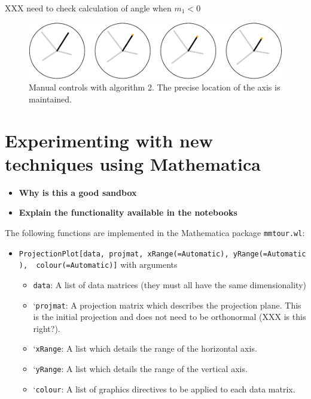 \documentclass[]{interact}
\theoremstyle{plain}%
\theoremstyle{definition}
\theoremstyle{remark}
\providecommand{\tightlist}{%
  \setlength{\itemsep}{0pt}\setlength{\parskip}{0pt}}
\def\tightlist{}
\begin{document}
XXX need to check calculation of angle when \(m_1 < 0\)

\begin{figure}
\includegraphics[width=1\linewidth]{paper_files/figure-latex/othermethod-1} \caption{Manual controls with algorithm 2. The precise location of the axis is maintained.}\label{fig:othermethod}
\end{figure}

\hypertarget{sec:implementation}{%
\section{Experimenting with new techniques using
Mathematica}\label{sec:implementation}}

\begin{itemize}
\tightlist
\item
  \textbf{Why is this a good sandbox}
\item
  \textbf{Explain the functionality available in the notebooks}
\end{itemize}

The following functions are implemented in the Mathematica package
\texttt{mmtour.wl}:

\begin{itemize}
\item
  \texttt{ProjectionPlot{[}data,\ projmat,\ xRange(=Automatic),\ yRange(=Automatic),\ \ colour(=Automatic){]}}
  with arguments

  \begin{itemize}
  \tightlist
  \item
    \texttt{data}: A list of data matrices (they must all have the same
    dimensionality)
  \item
    `\texttt{projmat}: A projection matrix which describes the
    projection plane. This is the initial projection and does not need
    to be orthonormal (XXX is this right?).
  \item
    `\texttt{xRange}: A list which details the range of the horizontal
    axis.
  \item
    `\texttt{yRange}: A list which details the range of the vertical
    axis.
  \item
    `\texttt{colour}: A list of graphics directives to be applied to
    each data matrix.
  \end{itemize}
\end{itemize}
\end{document}
